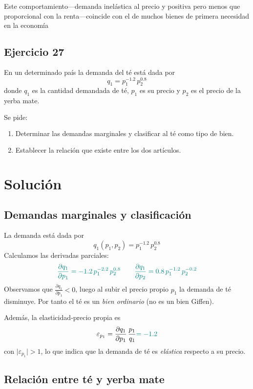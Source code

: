 \documentclass{article}
\begin{document}
{\color{teal}Este comportamiento—demanda inelástica al precio y positiva pero menos que proporcional con la renta—coincide con el de muchos bienes de primera necesidad en la economía}





\newpage

\subsection{Ejercicio 27}
En un determinado país la demanda del té está dada por
\[
q_1 = p_1^{-1.2}\,p_2^{0.8}
\]
donde \(q_1\) es la cantidad demandada de té, \(p_1\) es su precio y \(p_2\) es el precio de la yerba mate.

\medskip

Se pide:
\begin{enumerate}
  \item Determinar las demandas marginales y clasificar al té como tipo de bien.
  \item Establecer la relación que existe entre los dos artículos.
\end{enumerate}

\newpage
\section*{Solución}

\subsection*{Demandas marginales y clasificación}

La demanda está dada por
\[
q_1(p_1,p_2)=p_1^{-1.2}\,p_2^{0.8}
\]
Calculamos las derivadas parciales:
\[
\color{teal}{\frac{\partial q_1}{\partial p_1} = -1.2\,p_1^{-2.2}\,p_2^{0.8}}
\qquad
\color{teal}{\frac{\partial q_1}{\partial p_2} = 0.8\,p_1^{-1.2}\,p_2^{-0.2}}
\]
Observamos que
\(\displaystyle \frac{\partial q_1}{\partial p_1}<0\),
luego al subir el precio propio \(p_1\) la demanda de té disminuye.
{Por tanto el té es un \emph{\color{teal}bien ordinario}} (no es un bien Giffen).

Además, la elasticidad‑precio propia es
\[
\varepsilon_{p_1}
=\frac{\partial q_1}{\partial p_1}\,\frac{p_1}{q_1}
\color{teal}{= -1.2}
\]
con \(\lvert\varepsilon_{p_1}\rvert>1\), {\color{teal}lo que indica que la demanda de té es \emph{elástica} respecto a su precio}.

\subsection*{Relación entre té y yerba mate}
\end{document}
